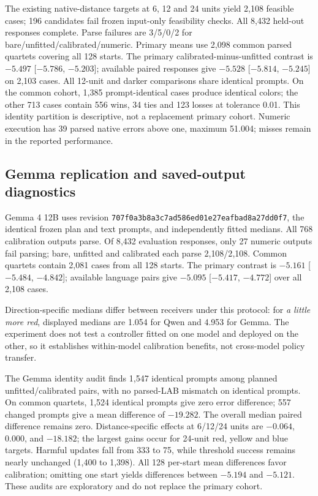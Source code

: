The existing native-distance targets at 6, 12 and 24 units yield 2{,}108
feasible cases; 196 candidates fail frozen input-only feasibility checks.
All 8{,}432 held-out responses complete. Parse failures are 3/5/0/2 for
bare/unfitted/calibrated/numeric. Primary means use 2{,}098 common parsed
quartets covering all 128 starts. The primary calibrated-minus-unfitted
contrast is $-5.497$ [$-5.786$, $-5.203$]; available paired responses
give $-5.528$ [$-5.814$, $-5.245$] on 2{,}103 cases.
All 12-unit and darker comparisons share identical prompts. On the common
cohort, 1{,}385 prompt-identical cases produce identical colors; the other
713 cases contain 556 wins, 34 ties and 123 losses at tolerance 0.01.
This identity partition is descriptive, not a replacement primary cohort.
Numeric execution has 39 parsed native errors above one, maximum 51.004;
misses remain in the reported performance.

\subsection{Gemma replication and saved-output diagnostics}
Gemma 4 12B uses revision \texttt{707f0a3b8a3c7ad586ed}\allowbreak\texttt{01e27eafbad8a27dd0f7},
the identical frozen plan and text prompts, and independently fitted medians.
All 768 calibration outputs parse. Of 8{,}432 evaluation responses, only
27 numeric outputs fail parsing; bare, unfitted and calibrated each parse
2{,}108/2{,}108. Common quartets contain 2{,}081 cases from all 128 starts.
The primary contrast is $-5.161$ [$-5.484$, $-4.842$]; available language
pairs give $-5.095$ [$-5.417$, $-4.772$] over all 2{,}108 cases.

Direction-specific medians differ between receivers under this protocol:
for \textit{a little more red}, displayed medians are 1.054 for Qwen
and 4.953 for Gemma. The experiment does not test a controller fitted on
one model and deployed on the other, so it establishes within-model
calibration benefits, not cross-model policy transfer.

The Gemma identity audit finds 1{,}547 identical prompts among planned
unfitted/calibrated pairs, with no parsed-LAB mismatch on identical prompts.
On common quartets, 1{,}524 identical prompts give zero error difference;
557 changed prompts give a mean difference of $-19.282$.
The overall median paired difference remains zero. Distance-specific effects
at 6/12/24 units are $-0.064$, $0.000$, and $-18.182$; the largest gains
occur for 24-unit red, yellow and blue targets. Harmful updates fall from
333 to 75, while threshold success remains nearly unchanged (1{,}400 to
1{,}398). All 128 per-start mean differences favor calibration; omitting
one start yields differences between $-5.194$ and $-5.121$.
These audits are exploratory and do not replace the primary cohort.

